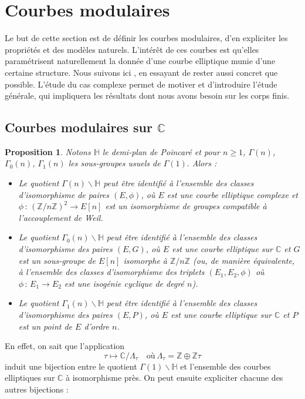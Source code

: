 \documentclass[11pt,a4paper]{article}
\newcommand{\Z}{\mathbb{Z}}
\newcommand{\C}{\mathbb{C}}
\renewcommand{\H}{\mathbb{H}}
\renewcommand{\b}{\backslash}
\newcommand{\vers}{\longrightarrow}
\newcommand{\de}{\,:\,}
\newtheorem*{prop}{Proposition}
\theoremstyle{definition}
\begin{document}
\newpage

\section{Courbes modulaires}


Le but de cette section est de définir les courbes modulaires, d'en expliciter les propriétés et des modèles naturels. L'intérêt de ces courbes est qu'elles paramétrisent naturellement la donnée d'une courbe elliptique munie d'une certaine structure. Nous suivons ici \cite{KaMa}, en essayant de rester aussi concret que possible. L'étude du cas complexe permet de motiver et d'introduire l'étude générale, qui impliquera les résultats dont nous avons besoin sur les corps finis.


\subsection{Courbes modulaires sur $\C$}

\begin{prop}

Notons $\H$ le demi-plan de Poincaré et pour $n\geq 1$, $\Gamma(n)$, $\Gamma_0(n)$, $\Gamma_1(n)$ les sous-groupes usuels de $\Gamma(1).$ Alors :

\begin{itemize}
\item[•] Le quotient $\Gamma(n)\b \H$ peut être identifié à l'ensemble des classes d'isomorphisme de paires $(E,\phi)$, où $E$ est une courbe elliptique complexe et $\phi\de (\Z/n\Z)^2\vers E[n]$ est un isomorphisme de groupes compatible à l'accouplement de Weil.
\item[•] Le quotient $\Gamma_0(n)\b \H$ peut être identifié à l'ensemble des classes d'isomorphisme des paires $(E,G)$, où $E$ est une courbe elliptique sur $\C$ et $G$ est un sous-groupe de $E[n]$ isomorphe à $\Z/n\Z$ (ou, de manière équivalente, à l'ensemble des classes d'isomorphisme des triplets $(E_1, E_2, \phi)$ où $\phi\de E_1\vers E_2$ est une isogénie cyclique de degré $n$).
\item[•] Le quotient $\Gamma_1(n)\b \H$ peut être identifié à l'ensemble des classes d'isomorphisme des paires $(E,P)$, où $E$ est une courbe elliptique sur $\C$ et $P$ est un point de $E$ d'ordre $n$.
\end{itemize}

\end{prop}

En effet, on sait que l'application
$$\tau \longmapsto \C/\Lambda_\tau\quad \text{où}\ \Lambda_\tau = \Z \oplus \Z\tau$$
induit une bijection entre le quotient $\Gamma(1)\b \H$ et l'ensemble des courbes elliptiques sur $\C$ à isomorphisme près. On peut ensuite expliciter chacune des autres bijections :
\end{document}
